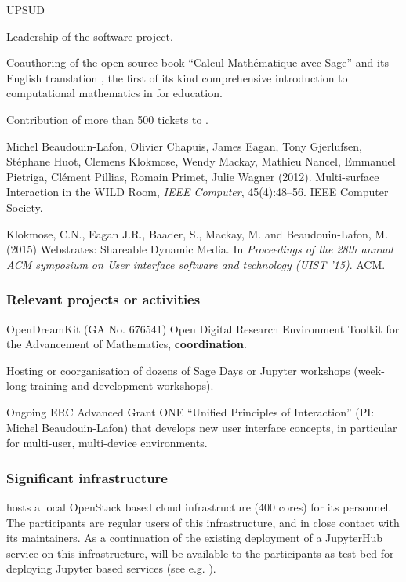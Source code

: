 \begin{sitedescription}{UPSUD}
\begin{compactenum}
\item Leadership of the \SageCombinat software project.
\item Coauthoring of the open source book ``Calcul Mathématique avec
  Sage'' and its English translation , the first of its kind
  comprehensive introduction to computational mathematics in \Sage for
  education.
\item Contribution of more than 500 tickets to \Sage.
\item
Michel Beaudouin-Lafon, Olivier Chapuis, James Eagan, Tony Gjerlufsen, Stéphane Huot, Clemens Klokmose, Wendy Mackay, Mathieu Nancel, Emmanuel Pietriga, Clément Pillias, Romain Primet, Julie Wagner (2012). Multi-surface Interaction in the WILD Room, \emph{IEEE Computer}, 45(4):48–56. IEEE Computer Society.
\item
Klokmose, C.N., Eagan J.R., Baader, S., Mackay, M. and Beaudouin-Lafon, M. (2015) Webstrates: Shareable Dynamic Media. In \emph{Proceedings of the 28th annual ACM symposium on User interface software and technology (UIST ’15)}. ACM.
\end{compactenum}

\subsubsection*{Relevant projects or activities}

\begin{compactenum}
\item OpenDreamKit (GA No. 676541) Open Digital Research Environment
  Toolkit for the Advancement of Mathematics, \textbf{coordination}.
\item Hosting or coorganisation of dozens of Sage Days or Jupyter workshops (week-long training and development workshops).
\item {}
Ongoing ERC Advanced Grant ONE ``Unified Principles of Interaction'' (PI: Michel Beaudouin-Lafon) that develops new user interface concepts, in particular for multi-user, multi-device environments.
\end{compactenum}

\subsubsection*{Significant infrastructure}

 hosts a local OpenStack based cloud infrastructure
 (400 cores) for its personnel. The participants
are regular users of this infrastructure, and in close contact with
its maintainers. As a continuation of the existing deployment of a
JupyterHub service on this infrastructure,  will be
available to the participants as test bed for deploying Jupyter based
services (see e.g. ).


\end{sitedescription}
